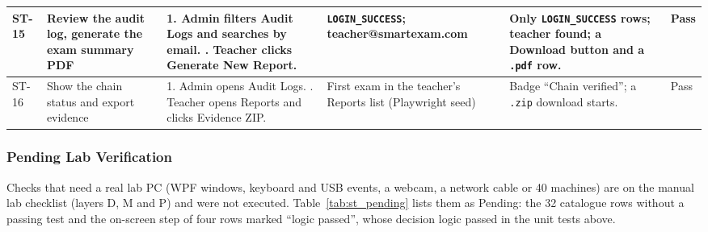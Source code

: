 {\begin{longtable}{@{}P{1.1cm}P{2.5cm}P{3.5cm}P{2.6cm}P{2.9cm}>{\centering\arraybackslash}p{1.8cm}@{}}
ST-15 & Review the audit log, generate the exam summary PDF & 1. Admin filters Audit Logs and searches by email. . Teacher clicks Generate New Report. & \texttt{LOGIN\_\allowbreak{}SUCCESS}; teacher@\allowbreak{}smartexam.\allowbreak{}com  & Only \texttt{LOGIN\_\allowbreak{}SUCCESS} rows; teacher found; a Download button and a \texttt{.pdf} row. & Pass\\ \hline
ST-16 & Show the chain status and export evidence & 1. Admin opens Audit Logs. . Teacher opens Reports and clicks Evidence ZIP. & First exam in the teacher's Reports list (Playwright seed)  & Badge ``Chain verified''; a \texttt{.zip} download starts. & Pass\\
\end{longtable}}

\subsubsection{Pending Lab Verification}\label{subsubsec:st_pending}
Checks that need a real lab PC (WPF windows, keyboard and USB events, a webcam, a network cable or 40 machines) are on the manual lab checklist (layers D, M and P) and were not executed. Table~\ref{tab:st_pending} lists them as Pending: the 32 catalogue rows without a passing test and the on-screen step of four rows marked ``logic passed'', whose decision logic passed in the unit tests above.


